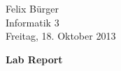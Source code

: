 \documentclass[parskip=full]{scrartcl}
\begin{document}
Felix Bürger\\
Informatik 3\\
Freitag, 18. Oktober 2013

\Huge\textbf{Lab Report}

\doublespacing
\normalsize

\lipsum[1]

\lipsum[2]
\end{document}
